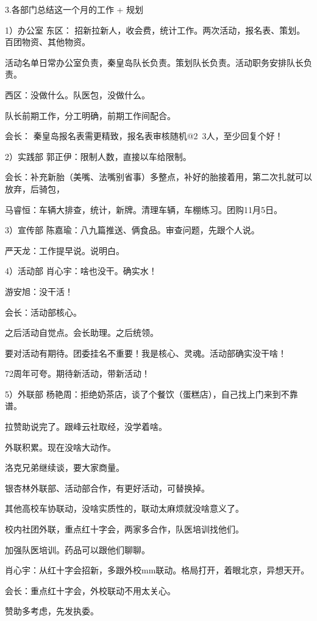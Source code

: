 \documentclass{ctexbook}
\begin{document}
3.各部门总结这一个月的工作 + 规划 

1）办公室 东区： 招新拉新人，收会费，统计工作。两次活动，报名表、策划。百团物资、其他物资。

活动名单日常办公室负责，秦皇岛队长负责。策划队长负责。活动职务安排队长负责。 

西区：没做什么。队医包，没做什么。

队长前期工作，分工明确，前期工作间配合。 

会长： 秦皇岛报名表需更精致，报名表审核随机@2~3人，至少回复个好！ 

2）实践部 郭正伊：限制人数，直接以车给限制。 

会长：补充新胎（美嘴、法嘴别省事）多整点，补好的胎接着用，第二次扎就可以放弃，后骑包，

马睿恒：车辆大排查，统计，新牌。清理车辆，车棚练习。团购11月5日。 

3）宣传部 陈嘉瑜：八九篇推送、俩食品。审查问题，先跟个人说。 

严天龙：工作提早说。说明白。 

4）活动部 肖心宇：啥也没干。确实水！  

游安旭：没干活！ 

会长：活动部核心。

之后活动自觉点。会长助理。之后统领。

要对活动有期待。团委挂名不重要！我是核心、灵魂。活动部确实没干啥！

72周年可夸。期待新活动，带新活动！ 

5）外联部 杨艳周：拒绝奶茶店，谈了个餐饮（蛋糕店），自己找上门来到不靠谱。

拉赞助说完了。跟峰云社取经，没学着啥。

外联积累。现在没啥大动作。

洛克兄弟继续谈，要大家商量。

银杏林外联部、活动部合作，有更好活动，可替换掉。

其他高校车协联动，没啥实质性的，联动太麻烦就没啥意义了。 

校内社团外联，重点红十字会，两家多合作，队医培训找他们。

加强队医培训。药品可以跟他们聊聊。 

肖心宇：从红十字会招新，多跟外校mm联动。格局打开，着眼北京，异想天开。 

会长：重点红十字会，外校联动不用太关心。

赞助多考虑，先发执委。 
\end{document}
